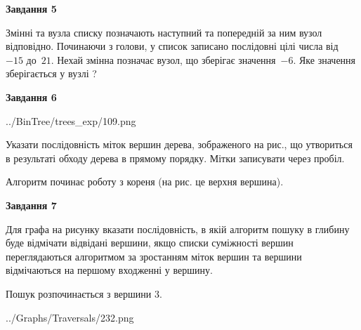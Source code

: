 \documentclass[12pt, ukrainian]{article}
\begin{document}
{\begin {large}
{\begin {center}\textbf{Завдання 5}\end {center}}\par
Змінні  та  вузла списку позначають наступний та попередній за ним вузол відповідно. Починаючи з голови, у список записано послідовні цілі числа від~$-15$ до~$21$. Нехай змінна  позначає вузол, що зберігає значення~$-6$.
Яке значення зберігається у вузлі  ?\par
\newpage

{\begin {center}\textbf{Завдання 6}\end {center}}\par

\begin{center}
	{../BinTree/trees_exp/109.png}
\end{center}
Указати послідовність міток вершин дерева, зображеного на рис., що утвориться в результаті обходу дерева в прямому порядку. Мітки записувати через пробіл.\par Алгоритм починає роботу з кореня (на рис. це верхня вершина).\par
\newpage

{\begin {center}\textbf{Завдання 7}\end {center}}\par
Для графа на рисунку вказати послідовність, в якій алгоритм пошуку в глибину буде відмічати відвідані вершини, якщо списки суміжності вершин переглядаються алгоритмом за зростанням міток вершин та вершини відмічаються на першому вход\-женні у вершину.\par
Пошук розпочинається з вершини 3.\par

\begin{center}
	{../Graphs/Traversals/232.png}
\end{center}\par
\newpage


\end{large}}
\end{document}
